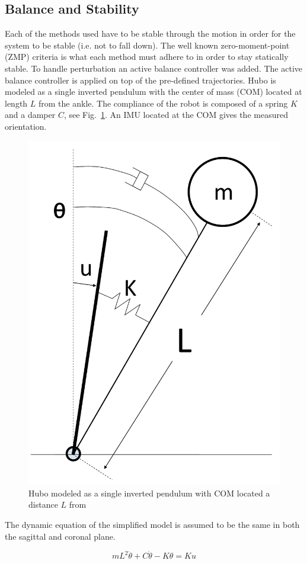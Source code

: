 \subsection{Balance and Stability}\label{sec:sec:balance}
Each of the methods used have to be stable through the motion in order for the system to be stable (i.e. not to fall down).  
The well known zero-moment-point (ZMP) criteria is what each method must adhere to in order to stay statically stable\cite{Vukobratovic19721}.  
To handle perturbation an active balance controller was added.  
The active balance controller is applied on top of the pre-defined trajectories.  
Hubo is modeled as a single inverted pendulum with the center of mass (COM) located at length $L$ from the ankle.  
The compliance of the robot is composed of a spring $K$ and a damper $C$, see Fig.~\ref{fig:invPen}.  
An IMU located at the COM gives the measured orientation.

\begin{figure}[t]
  \centering
\includegraphics[width=0.6\columnwidth]{./pix/invPen3.pdf}
  \caption{Hubo modeled as a single inverted pendulum with COM located a distance $L$ from }
  \label{fig:invPen}
\end{figure}

The dynamic equation of the simplified model is assumed to be the same in both the sagittal and coronal plane.

\begin{equation}
mL^2\ddot{\theta}+C\dot{\theta}-K\theta = Ku
\end{equation}

